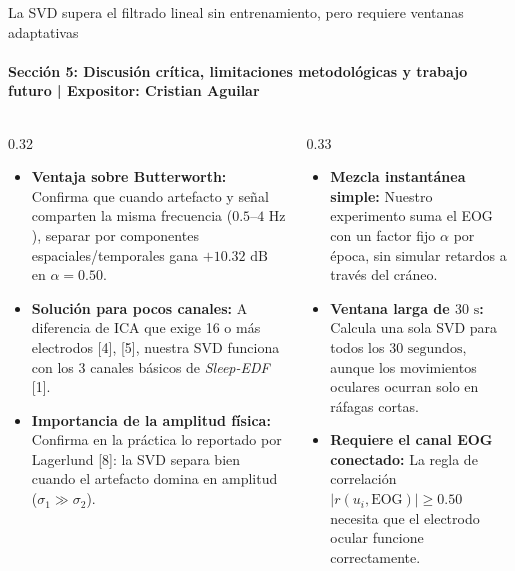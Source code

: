 \documentclass[aspectratio=169,9pt]{beamer}
\begin{document}
\begin{frame}{La SVD supera el filtrado lineal sin entrenamiento, pero requiere ventanas adaptativas}
  \framesubtitle{Secci\'on 5: Discusi\'on cr\'itica, limitaciones metodol\'ogicas y trabajo futuro | Expositor: Cristian Aguilar}

  \begin{columns}[T,onlytextwidth]
    \begin{column}{0.32\textwidth}
      \begin{tcolorbox}[navycard, title={\scriptsize\bfseries 1. Discusi\'on frente al Estado del Arte}, colbacktitle=UDNavy, coltitle=white, equal height group=dlf]
        \scriptsize
        \begin{itemize}
          \item \textbf{Ventaja sobre Butterworth:} Confirma que cuando artefacto y se\~nal comparten la misma frecuencia ($0.5\text{--}4\text{ Hz}$), separar por componentes espaciales/temporales gana $+10.32\text{ dB}$ en $\alpha=0.50$.
          \item \textbf{Soluci\'on para pocos canales:} A diferencia de ICA que exige 16 o m\'as electrodos [4], [5], nuestra SVD funciona con los 3 canales b\'asicos de \textit{Sleep-EDF} [1].
          \item \textbf{Importancia de la amplitud f\'isica:} Confirma en la pr\'actica lo reportado por Lagerlund [8]: la SVD separa bien cuando el artefacto domina en amplitud ($\sigma_1 \gg \sigma_2$).
        \end{itemize}
      \end{tcolorbox}
    \end{column}

    \begin{column}{0.33\textwidth}
      \begin{tcolorbox}[redcard, title={\scriptsize\bfseries 2. Limitaciones del Estudio Actual}, colbacktitle=UDTerracotta!85!black, coltitle=white, equal height group=dlf]
        \scriptsize
        \begin{itemize}
          \item \textbf{Mezcla instant\'anea simple:} Nuestro experimento suma el EOG con un factor fijo $\alpha$ por \'epoca, sin simular retardos a trav\'es del cr\'aneo.
          \item \textbf{Ventana larga de $30\text{ s}$:} Calcula una sola SVD para todos los $30\text{ segundos}$, aunque los movimientos oculares ocurran solo en r\'afagas cortas.
          \item \textbf{Requiere el canal EOG conectado:} La regla de correlaci\'on $|r(u_i,\text{EOG})|\ge 0.50$ necesita que el electrodo ocular funcione correctamente.
        \end{itemize}
      \end{tcolorbox}
    \end{column}


\end{columns}
\end{frame}
\end{document}
